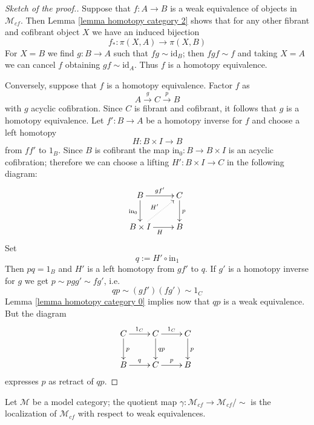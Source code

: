 \begin{refsection}
\begin{proof}[Sketch of the proof.]
Suppose that $f \colon A \to B$ is a weak equivalence of objects in $\mathcal M_{cf}$. Then Lemma \ref{lemma homotopy category 2} shows that for any other fibrant and cofibrant object $X$ we have an induced bijection
\[
f_* \colon \pi(X,A) \to \pi(X,B)
\]
For $X = B$ we find $g \colon B \to A$ such that $fg \sim \mathrm{id}_B$; then $fgf \sim f$ and taking $X = A$ we can cancel $f$ obtaining $gf \sim \mathrm{id}_A$. Thus $f$ is a homotopy equivalence.

Conversely, suppose that $f$ is a homotopy equivalence. Factor $f$ as
\[
A \xrightarrow{g} C \xrightarrow{p} B
\]
with $g$ acyclic cofibration. Since $C$ is fibrant and cofibrant, it follows that $g$ is a homotopy equivalence. Let $f' \colon B \to A$ be a homotopy inverse for $f$ and choose a left homotopy
\[
H \colon B \times I \to B
\]
from $ff'$ to $1_B$. Since $B$ is cofibrant the map $\mathrm{in}_0 \colon B \to B \times I$ is an acyclic cofibration; therefore we can choose a lifting $H' \colon B \times I \to C$ in the following diagram:
\[
\xymatrix{
B \ar[d]_{\mathrm{in}_0} \ar[r]^{gf'} & C \ar[d]^p \\ B \times I \ar@{.>}[ur]^{H'} \ar[r]_H & B
}
\]
Set
\[
q := H' \circ \mathrm{in}_1
\]
Then $pq = 1_B$ and $H'$ is a left homotopy from $gf'$ to $q$. If $g'$ is a homotopy inverse for $g$ we get $p \sim pgg' \sim fg'$, i.e.
\[
qp \sim (gf') (fg') \sim 1_C
\]
Lemma \ref{lemma homotopy category 0} implies now that $qp$ is a weak equivalence. But the diagram
\[
\xymatrix{
C \ar[r]^{1_C} \ar[d]^p & C \ar[r]^{1_C} \ar[d]^{qp} & C \ar[d]^p \\ B \ar[r]^q & C \ar[r]^p & B
}
\]
expresses $p$ as retract of $qp$.
\end{proof}

\begin{cor} \label{cor homotopy for fibrant cofibrant}
Let $\mathcal M$ be a model category; the quotient map $\gamma \colon \mathcal M_{cf} \to \mathcal M_{cf} / \sim$ is the localization of $\mathcal M_{cf}$ with respect to weak equivalences.
\end{cor}


\end{refsection}
